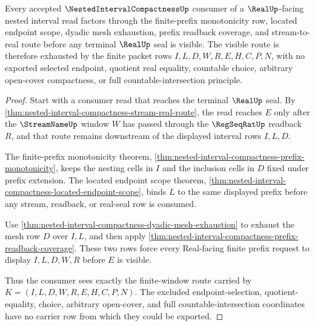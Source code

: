 \begin{theorem}
\label{thm:nested-interval-finite-window-exhaustion}
Every accepted $\NestedIntervalCompactnessUp$ consumer of a $\RealUp$-facing nested interval read factors through the finite-prefix monotonicity row, located endpoint scope, dyadic mesh exhaustion, prefix readback coverage, and stream-to-real route before any terminal $\RealUp$ seal is visible. The visible route is therefore exhausted by the finite packet rows $I,L,D,W,R,E,H,C,P,N$, with no exported selected endpoint, quotient real equality, countable choice, arbitrary open-cover compactness, or full countable-intersection principle.
\end{theorem}
\begin{proof}
Start with a consumer read that reaches the terminal $\RealUp$ seal. By \autoref{thm:nested-interval-compactness-stream-real-route}, the read reaches $E$ only after the $\StreamNameUp$ window $W$ has passed through the $\RegSeqRatUp$ readback $R$, and that route remains downstream of the displayed interval rows $I,L,D$.

The finite-prefix monotonicity theorem, \autoref{thm:nested-interval-compactness-prefix-monotonicity}, keeps the nesting cells in $I$ and the inclusion cells in $D$ fixed under prefix extension. The located endpoint scope theorem, \autoref{thm:nested-interval-compactness-located-endpoint-scope}, binds $L$ to the same displayed prefix before any stream, readback, or real-seal row is consumed.

Use \autoref{thm:nested-interval-compactness-dyadic-mesh-exhaustion} to exhaust the mesh row $D$ over $I,L$, and then apply \autoref{thm:nested-interval-compactness-prefix-readback-coverage}. These two rows force every Real-facing finite prefix request to display $I,L,D,W,R$ before $E$ is visible.

Thus the consumer sees exactly the finite-window route carried by $K=(I,L,D,W,R,E,H,C,P,N)$. The excluded endpoint-selection, quotient-equality, choice, arbitrary open-cover, and full countable-intersection coordinates have no carrier row from which they could be exported.
\end{proof}


